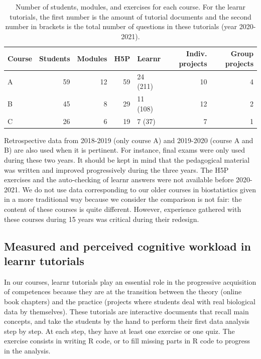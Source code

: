 \documentclass{aims}
\theoremstyle{definition}
\begin{document}
\begin{table}

\caption{\label{tab:tab_course_summary}\label{tab:tab_course} Number of students, modules, and exercises for each course. For the learnr tutorials, the first number is the amount of tutorial documents and the second number in brackets is the total number of questions in these tutorials (year 2020-2021).}
\centering
\begin{tabular}[t]{l|r|r|r|l|r|r}
\hline
Course & Students & Modules & H5P & Learnr & Indiv. projects & Group projects\\
\hline
A & 59 & 12 & 59 & 24 (211) & 10 & 4\\
\hline
B & 45 & 8 & 29 & 11 (108) & 12 & 2\\
\hline
C & 26 & 6 & 19 & 7 (37) & 7 & 1\\
\hline
\end{tabular}
\end{table}

Retrospective data from 2018-2019 (only course A) and 2019-2020 (course
A and B) are also used when it is pertinent. For instance, final exams
were only used during these two years. It should be kept in mind that
the pedagogical material was written and improved progressively during
the three years. The H5P exercises and the auto-checking of learnr
answers were not available before 2020-2021. We do not use data
corresponding to our older courses in biostatistics given in a more
traditional way because we consider the comparison is not fair: the
content of these courses is quite different. However, experience
gathered with these courses during 15 years was critical during their
redesign.

\hypertarget{measured-and-perceived-cognitive-workload-in-learnr-tutorials}{%
\subsection{Measured and perceived cognitive workload in learnr
tutorials}\label{measured-and-perceived-cognitive-workload-in-learnr-tutorials}}

In our courses, learnr tutorials play an essential role in the
progressive acquisition of competences because they are at the
transition between the theory (online book chapters) and the practice
(projects where students deal with real biological data by themselves).
These tutorials are interactive documents that recall main concepts, and
take the students by the hand to perform their first data analysis step
by step. At each step, they have at least one exercise or one quiz. The
exercise consists in writing R code, or to fill missing parts in R code
to progress in the analysis.
\end{document}
